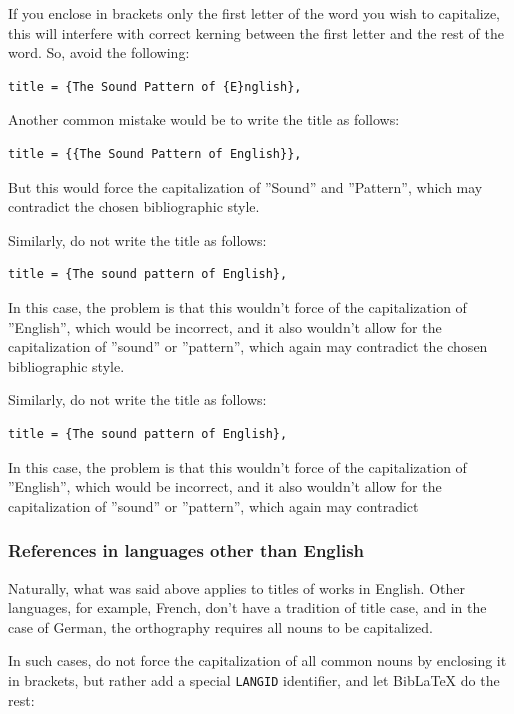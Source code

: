 If you enclose in brackets only the first letter of the word you wish to capitalize, this will interfere with correct kerning between the first letter and the rest of the word. So, avoid the following:

\begin{verbatim}
title = {The Sound Pattern of {E}nglish},
\end{verbatim}

Another common mistake would be to write the title as follows:

\begin{verbatim}
title = {{The Sound Pattern of English}},
\end{verbatim}

But this would force the capitalization of ''Sound'' and ''Pattern'', which may contradict the chosen bibliographic style.

Similarly, do not write the title as follows:

\begin{verbatim}
title = {The sound pattern of English},
\end{verbatim}

In this case, the problem is that this wouldn't force of the capitalization of ''English'', which would be incorrect, and it also wouldn't allow for the capitalization of ''sound'' or ''pattern'', which again may contradict the chosen bibliographic style.

Similarly, do not write the title as follows:

\begin{verbatim}
title = {The sound pattern of English},
\end{verbatim}

In this case, the problem is that this wouldn't force of the capitalization of ''English'', which would be incorrect, and it also wouldn't allow for the capitalization of ''sound'' or ''pattern'', which again may contradict

\subsubsection*{References in languages other than English}

Naturally, what was said above applies to titles of works in English. Other languages, for example, French, don't have a tradition of title case, and in the case of German, the orthography requires all nouns to be capitalized.

In such cases, do not force the capitalization of all common nouns by enclosing it in brackets, but rather add a special \texttt{LANGID} identifier, and let BibLaTeX do the rest:

